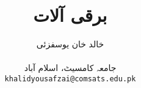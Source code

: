 \documentclass[leqno,b5paper]{book}
\author{
خالد خان یوسفزئی\\
\\
{\small {جامعہ کامسیٹ، اسلام آباد}}\\
\texttt{khalidyousafzai@comsats.edu.pk}
}
\title{برقی آلات}
\date{}                           %
\begin{document}
\begin{urdufont}

\renewcommand*{\contentsname}{عنوان}    %

\frontmatter                          %

\maketitle


\tableofcontents
\pagestyle{empty}
%



\mainmatter                      %
\renewcommand*{\chaptername}{باب}

\pagestyle{headings}

\pgfcircversion











\backmatter

\renewcommand*{\indexname}{فرہنگ}      %
\cleardoublepage
{}
\printindex

\end{urdufont}
\end{document}
